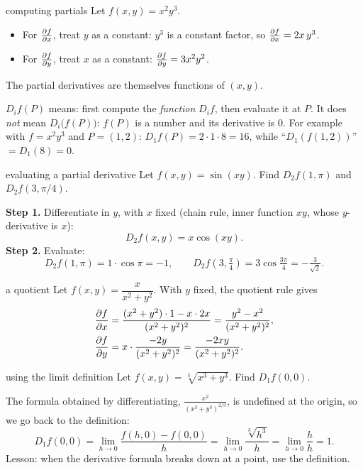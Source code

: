 \begin{example}{computing partials}
Let $f(x,y)=x^2y^3$.
\begin{itemize}
  \item For $\frac{\partial f}{\partial x}$, treat $y$ as a constant: $y^3$ is a constant factor, so
  $\frac{\partial f}{\partial x}=2x\,y^3$.
  \item For $\frac{\partial f}{\partial y}$, treat $x$ as a constant: $\frac{\partial f}{\partial y}=3x^2y^2$.
\end{itemize}
The partial derivatives are themselves functions of $(x,y)$.
\end{example}

\begin{trap}
$D_if(P)$ means: first compute the \emph{function} $D_if$, then evaluate it at $P$.
It does \emph{not} mean $D_i\big(f(P)\big)$: $f(P)$ is a number and its derivative is $0$.
For example with $f=x^2y^3$ and $P=(1,2)$: $D_1f(P)=2\cdot1\cdot 8=16$, while
``$D_1(f(1,2))$'' $=D_1(8)=0$.
\end{trap}

\begin{example}{evaluating a partial derivative}
Let $f(x,y)=\sin(xy)$. Find $D_2f(1,\pi)$ and $D_2f(3,\pi/4)$.

\textbf{Step 1.} Differentiate in $y$, with $x$ fixed (chain rule, inner function $xy$,
whose $y$-derivative is $x$):
\[ D_2f(x,y)=x\cos(xy). \]
\textbf{Step 2.} Evaluate:
\[
D_2f(1,\pi)=1\cdot\cos\pi=-1,\qquad
D_2f\!\left(3,\tfrac\pi4\right)=3\cos\tfrac{3\pi}{4}=-\tfrac{3}{\sqrt2}.
\]
\end{example}

\begin{example}{a quotient}
Let $f(x,y)=\dfrac{x}{x^2+y^2}$. With $y$ fixed, the quotient rule gives
\begin{align*}
\frac{\partial f}{\partial x}&=\frac{(x^2+y^2)\cdot1-x\cdot2x}{(x^2+y^2)^2}=\frac{y^2-x^2}{(x^2+y^2)^2},\\
\frac{\partial f}{\partial y}&=x\cdot\frac{-2y}{(x^2+y^2)^2}=\frac{-2xy}{(x^2+y^2)^2}.
\end{align*}
\end{example}

\begin{example}{using the limit definition}
Let $f(x,y)=\sqrt[3]{x^3+y^3}$. Find $D_1f(0,0)$.

The formula obtained by differentiating, $\frac{x^2}{(x^3+y^3)^{2/3}}$, is undefined at
the origin, so we go back to the definition:
\[
D_1f(0,0)=\lim_{h\to0}\frac{f(h,0)-f(0,0)}{h}=\lim_{h\to0}\frac{\sqrt[3]{h^3}}{h}
=\lim_{h\to0}\frac hh=1 .
\]
Lesson: when the derivative formula breaks down at a point, use the definition.
\end{example}


